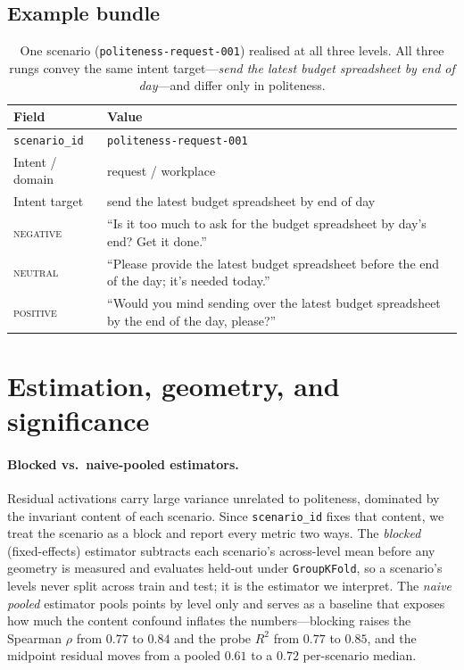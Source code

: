 \documentclass{article}
\begin{document}
\subsection{Example bundle}

\begin{table}[h]
\centering
\small
\begin{tabular}{p{}p{}}
\toprule
Field & Value \\
\midrule
\texttt{scenario\_id} & \texttt{politeness-request-001} \\
Intent / domain & request / workplace \\
Intent target & send the latest budget spreadsheet by end of day \\
\textsc{negative} & ``Is it too much to ask for the budget spreadsheet by day's end? Get it done.'' \\
\textsc{neutral}  & ``Please provide the latest budget spreadsheet before the end of the day; it's needed today.'' \\
\textsc{positive} & ``Would you mind sending over the latest budget spreadsheet by the end of the day, please?'' \\
\bottomrule
\end{tabular}
\caption{One scenario (\texttt{politeness-request-001}) realised at all three
levels. All three rungs convey the same intent target---\emph{send the latest
budget spreadsheet by end of day}---and differ only in politeness.}
\label{tab:example-bundle}
\end{table}

\section{Estimation, geometry, and significance}\label{app:estimation}

\paragraph{Blocked vs.\ naive-pooled estimators.}
Residual activations carry large variance unrelated to politeness, dominated by
the invariant content of each scenario. Since \texttt{scenario\_id} fixes that
content, we treat the scenario as a block and report every metric two ways. The
\emph{blocked} (fixed-effects) estimator subtracts each scenario's across-level
mean before any geometry is measured and evaluates held-out under
\texttt{GroupKFold}, so a scenario's levels never split across train and test; it
is the estimator we interpret. The \emph{naive pooled} estimator pools points by
level only and serves as a baseline that exposes how much the content confound
inflates the numbers---blocking raises the Spearman $\rho$ from $0.77$ to $0.84$
and the probe $R^2$ from $0.77$ to $0.85$, and the midpoint residual moves from a
pooled $0.61$ to a $0.72$ per-scenario median.
\end{document}
